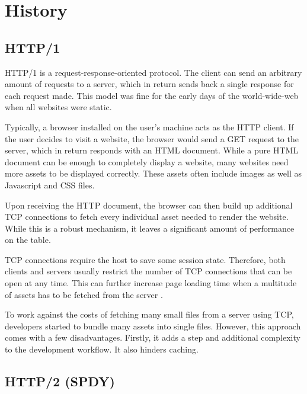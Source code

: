 \documentclass[conference]{IEEEtran}
\begin{document}
\section{History}

\subsection{HTTP/1}

HTTP/1 is a request-response-oriented protocol. The client can send an arbitrary amount of requests to a server, which in return sends back a single response for each request made. This model was fine for the early days of the world-wide-web when all websites were static. 

Typically, a browser installed on the user's machine acts as the HTTP client. If the user decides to visit a website, the browser would send a GET request to the server, which in return responds with an HTML document. While a pure HTML document can be enough to completely display a website, many websites need more assets to be displayed correctly. These assets often include images as well as Javascript and CSS files.

Upon receiving the HTTP document, the browser can then build up additional TCP connections to fetch every individual asset needed to render the website. While this is a robust mechanism, it leaves a significant amount of performance on the table.

TCP connections require the host to save some session state. Therefore, both clients and servers usually restrict the number of TCP connections that can be open at any time. This can further increase page loading time when a multitude of assets has to be fetched from the server \cite{HowQuickIsQuic}. 


To work against the costs of fetching many small files from a server using TCP, developers started to bundle many assets into single files. However, this approach comes with a few disadvantages. Firstly, it adds a step and additional complexity to the development workflow. It also hinders caching.

\subsection{HTTP/2 (SPDY)}
\end{document}
